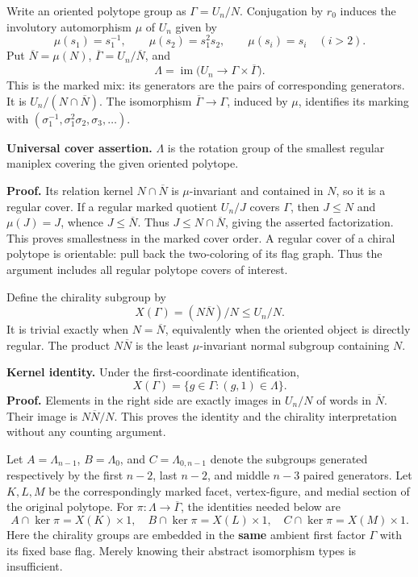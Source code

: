 \documentclass[
  10pt,
  letterpaper,
]{article}
\begin{document}
Write an oriented polytope group as \(\Gamma=U_n/N\). Conjugation by
\(r_0\) induces the involutory automorphism \(\mu\) of \(U_n\) given by
\[
 \mu(s_1)=s_1^{-1},\qquad \mu(s_2)=s_1^2s_2,
 \qquad \mu(s_i)=s_i\quad(i>2).
\] Put \(\overline N=\mu(N)\), \(\overline\Gamma=U_n/\overline N\), and
\[
 \Lambda=\operatorname{im}\bigl(U_n\longrightarrow
             \Gamma\times\overline\Gamma\bigr).
\] This is the marked mix: its generators are the pairs of corresponding
generators. It is \(U_n/(N\cap\overline N)\). The isomorphism
\(\overline\Gamma\to\Gamma\), induced by \(\mu\), identifies its marking
with \((\sigma_1^{-1},\sigma_1^2\sigma_2,\sigma_3,\ldots)\).

\textbf{Universal cover assertion.} \(\Lambda\) is the rotation group of
the smallest regular maniplex covering the given oriented polytope.

\textbf{Proof.} Its relation kernel \(N\cap\overline N\) is
\(\mu\)-invariant and contained in \(N\), so it is a regular cover. If a
regular marked quotient \(U_n/J\) covers \(\Gamma\), then \(J\le N\) and
\(\mu(J)=J\), whence \(J\le\overline N\). Thus
\(J\le N\cap\overline N\), giving the asserted factorization. This
proves smallestness in the marked cover order. A regular cover of a
chiral polytope is orientable: pull back the two-coloring of its flag
graph. Thus the argument includes all regular polytope covers of
interest.

Define the chirality subgroup by \[
 X(\Gamma)=(N\overline N)/N\le U_n/N.
\] It is trivial exactly when \(N=\overline N\), equivalently when the
oriented object is directly regular. The product \(N\overline N\) is the
least \(\mu\)-invariant normal subgroup containing \(N\).

\textbf{Kernel identity.} Under the first-coordinate identification, \[
 X(\Gamma)=\{g\in\Gamma:(g,1)\in\Lambda\}.             \tag{V1}
\] \textbf{Proof.} Elements in the right side are exactly images in
\(U_n/N\) of words in \(\overline N\). Their image is
\(N\overline N/N\). This proves the identity and the chirality
interpretation without any counting argument.

Let \(A=\Lambda_{n-1}\), \(B=\Lambda_0\), and \(C=\Lambda_{0,n-1}\)
denote the subgroups generated respectively by the first \(n-2\), last
\(n-2\), and middle \(n-3\) paired generators. Let \(K,L,M\) be the
correspondingly marked facet, vertex-figure, and medial section of the
original polytope. For \(\pi:\Lambda\to\overline\Gamma\), the identities
needed below are \[
 A\cap\ker\pi=X(K)\times1,\quad
 B\cap\ker\pi=X(L)\times1,\quad
 C\cap\ker\pi=X(M)\times1.                       \tag{V2}
\] Here the chirality groups are embedded in the \textbf{same} ambient
first factor \(\Gamma\) with its fixed base flag. Merely knowing their
abstract isomorphism types is insufficient.
\end{document}
